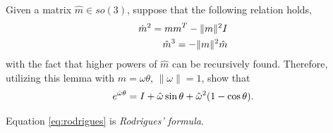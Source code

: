 \noindent 
\begin{homework}
	Given a matrix $\hat{m} \in so(3)$, suppose that the following relation holds,
	\begin{align}
	\hat{m}^2 = m m^T - \|m\|^2 I \\
	\hat{m}^3 = - \|m\|^2 \hat{m}
	\end{align}
	with the fact that higher powers of $\hat{m}$ can be recursively found. Therefore, utilizing this lemma with $m =\omega \theta$, $\|\omega\| = 1$, show that 
	\begin{align}
	e^{\hat{\omega}\theta}  = I + \hat{\omega} \sin \theta + \hat{\omega}^2(1 - \cos \theta).
	\label{eq:rodrigues}
	\end{align}
\end{homework} 
%
Equation \eqref{eq:rodrigues} is \textit{Rodrigues' formula}.


